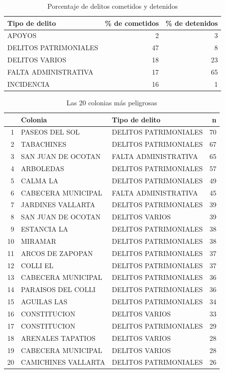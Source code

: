 \begin{table}[H]
\centering
\caption{Porcentaje de delitos cometidos y detenidos} 
\begin{tabular}{lrr}
  \hline
Tipo de delito & \% de cometidos & \% de detenidos \\ 
  \hline
APOYOS & 2 & 3 \\ 
  DELITOS PATRIMONIALES & 47 & 8 \\ 
  DELITOS VARIOS & 18 & 23 \\ 
  FALTA ADMINISTRATIVA & 17 & 65 \\ 
  INCIDENCIA & 16 & 1 \\ 
   \hline
\end{tabular}
\end{table}

\begin{table}[H]
\centering
\caption{Las 20 colonias más peligrosas} 
\begin{tabular}{rllr}
  \hline
 & Colonia & Tipo de delito & n \\ 
  \hline
1 & PASEOS DEL SOL & DELITOS PATRIMONIALES &  70 \\ 
  2 & TABACHINES & DELITOS PATRIMONIALES &  67 \\ 
  3 & SAN JUAN DE OCOTAN & FALTA ADMINISTRATIVA &  65 \\ 
  4 & ARBOLEDAS & DELITOS PATRIMONIALES &  57 \\ 
  5 & CALMA LA & DELITOS PATRIMONIALES &  49 \\ 
  6 & CABECERA MUNICIPAL & FALTA ADMINISTRATIVA &  45 \\ 
  7 & JARDINES VALLARTA & DELITOS PATRIMONIALES &  39 \\ 
  8 & SAN JUAN DE OCOTAN & DELITOS VARIOS &  39 \\ 
  9 & ESTANCIA LA & DELITOS PATRIMONIALES &  38 \\ 
  10 & MIRAMAR & DELITOS PATRIMONIALES &  38 \\ 
  11 & ARCOS DE ZAPOPAN & DELITOS PATRIMONIALES &  37 \\ 
  12 & COLLI EL & DELITOS PATRIMONIALES &  37 \\ 
  13 & CABECERA MUNICIPAL & DELITOS PATRIMONIALES &  36 \\ 
  14 & PARAISOS DEL COLLI & DELITOS PATRIMONIALES &  36 \\ 
  15 & AGUILAS LAS & DELITOS PATRIMONIALES &  34 \\ 
  16 & CONSTITUCION & DELITOS VARIOS &  33 \\ 
  17 & CONSTITUCION & DELITOS PATRIMONIALES &  29 \\ 
  18 & ARENALES TAPATIOS & DELITOS VARIOS &  28 \\ 
  19 & CABECERA MUNICIPAL & DELITOS VARIOS &  28 \\ 
  20 & CAMICHINES VALLARTA & DELITOS PATRIMONIALES &  26 \\ 
   \hline
\end{tabular}

\end{table}
